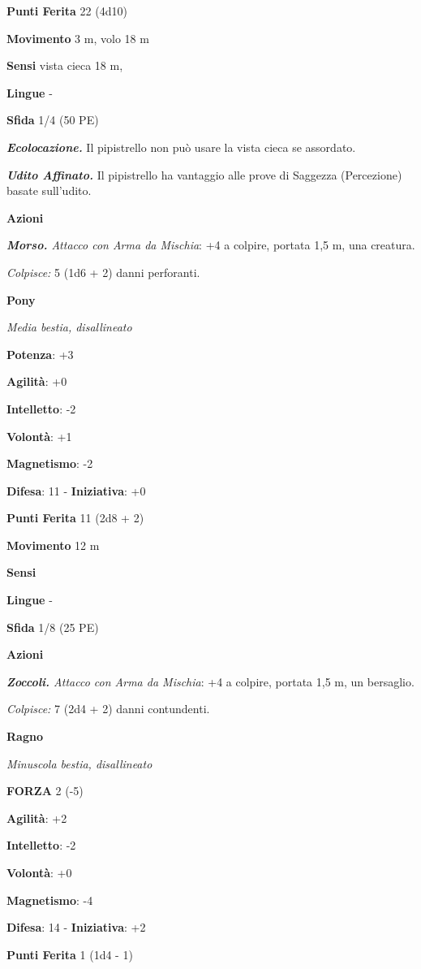 \begin{multicols}{2}
\textbf{Punti Ferita} 22 (4d10)

\textbf{Movimento} 3 m, volo 18 m

\textbf{Sensi} vista cieca 18 m, 

\textbf{Lingue} -

\textbf{Sfida} 1/4 (50 PE)

\emph{\textbf{Ecolocazione.}} Il pipistrello non può usare la vista
cieca se assordato.

\emph{\textbf{Udito Affinato.}} Il pipistrello ha vantaggio alle prove
di Saggezza (Percezione) basate sull'udito.

\textbf{Azioni}

\emph{\textbf{Morso.} Attacco con Arma da Mischia}: +4 a colpire,
portata 1,5 m, una creatura.

\emph{Colpisce:} 5 (1d6 + 2) danni perforanti.

\textbf{Pony}

\emph{Media bestia, disallineato}

\textbf{Potenza}: +3

\textbf{Agilità}: +0

\textbf{Intelletto}: -2

\textbf{Volontà}: +1

\textbf{Magnetismo}: -2

\textbf{Difesa}: 11 - \textbf{Iniziativa}: +0

\textbf{Punti Ferita} 11 (2d8 + 2)

\textbf{Movimento} 12 m

\textbf{Sensi} 

\textbf{Lingue} -

\textbf{Sfida} 1/8 (25 PE)

\textbf{Azioni}

\emph{\textbf{Zoccoli.} Attacco con Arma da Mischia}: +4 a colpire,
portata 1,5 m, un bersaglio.

\emph{Colpisce:} 7 (2d4 + 2) danni contundenti.

\textbf{Ragno}

\emph{Minuscola bestia, disallineato}

\textbf{FORZA} 2 (-5)

\textbf{Agilità}: +2

\textbf{Intelletto}: -2

\textbf{Volontà}: +0

\textbf{Magnetismo}: -4

\textbf{Difesa}: 14 - \textbf{Iniziativa}: +2

\textbf{Punti Ferita} 1 (1d4 - 1)


\end{multicols}

